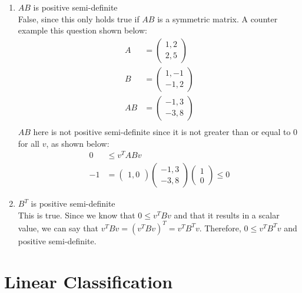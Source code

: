 \documentclass[11pt]{article}
\begin{document}
\begin{enumerate}
\begin{enumerate}
\item $AB$ is positive semi-definite\\
False, since this only holds true if $AB$ is a symmetric matrix. A counter example this question shown below:
\begin{align*}
    A &= \begin{pmatrix} 1, 2 \\ 2, 5 \end{pmatrix}\\
    B &= \begin{pmatrix} 1, -1 \\ -1, 2 \end{pmatrix}\\
    AB &= \begin{pmatrix} -1, 3 \\ -3, 8 \end{pmatrix}\\
\end{align*}
$AB$ here is not positive semi-definite since it is not greater than or equal to 0 for all $v$, as shown below:
\begin{align*}
    0 &\leq v^T AB v\\
    -1 &= \begin{pmatrix} 1, 0 \end{pmatrix} \begin{pmatrix} -1, 3 \\ -3, 8 \end{pmatrix} \begin{pmatrix} 1 \\ 0 \end{pmatrix} \leq 0
\end{align*}

\item $B^T$ is positive semi-definite\\
This is true. Since we know that $0 \leq v^T B v$ and that it results in a scalar value, we can say that
$v^T B v = (v^T B v)^T = v^T B^T v$. Therefore, $0 \leq v^T B^T v$ and positive semi-definite.
\end{enumerate} 

\end{enumerate}


\section{Linear Classification} 
\end{document}
